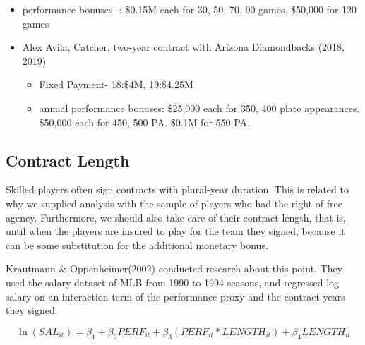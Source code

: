 \documentclass[dvipdfmx, 12pt]{article}
\begin{document}
\begin{table}
\begin{itemize}
\begin{itemize}
      \item performance bonuses- : \$0.15M each for 30, 50, 70, 90 games. \$50,000 for 120 games
    \end{itemize}
  \end{itemize}

\begin{itemize}
  \item Alex Avila, Catcher, two-year contract with Arizona Diamondbacks (2018, 2019)

  \begin{itemize}
    \item Fixed Payment- 18:\$4M, 19:\$4.25M

    \item annual performance bonuses: \$25,000 each for 350, 400 plate appearances. \$50,000 each for 450, 500 PA. \$0.1M for 550 PA.
  \end{itemize}
\end{itemize}
\end{table}



\subsection{Contract Length}

Skilled players often sign contracts with plural-year duration. This is related to why we supplied analysis with the sample of players who had the right of free agency. Furthermore, we should also take care of their contract length, that is, until when the players are insured to play for the team they signed, because it can be some substitution for the additional monetary bonus.

Krautmann \& Oppenheimer(2002) conducted research about this point. They used the salary dataset of MLB from 1990 to 1994 seasons, and regressed log salary on an interaction term of the performance proxy and the contract years they signed.

\[
\ln(SAL_{it}) = \beta_1 + \beta_2 PERF_{it} + \beta_3 (PERF_{it} * LENGTH_{it})+ \beta_4 LENGTH_{it}
\]
\end{document}
